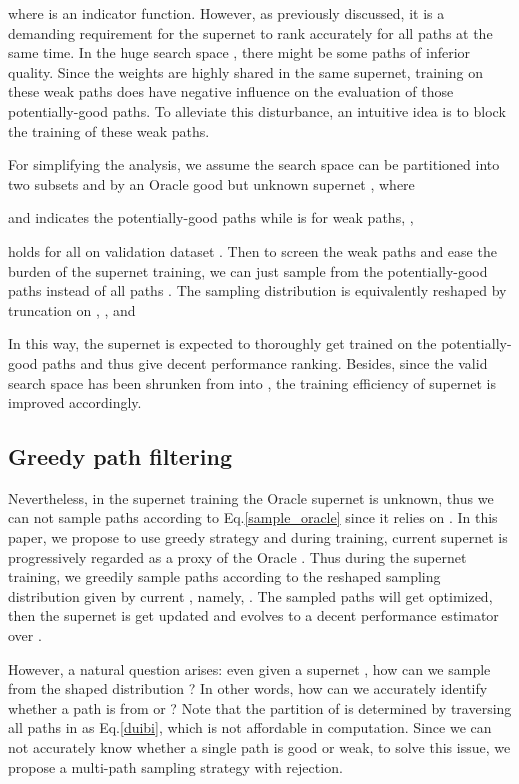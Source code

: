 \documentclass[10pt,twocolumn,letterpaper]{article}
\begin{document}
where  is an indicator function. However, as previously discussed, it is a demanding requirement for the supernet to rank accurately for all paths at the same time. In the huge search space , there might be some paths of inferior quality. Since the weights are highly shared in the same supernet, training on these weak paths does have negative influence on the evaluation of those potentially-good paths. To alleviate this disturbance, an intuitive idea is to block the training of these weak paths. 

For simplifying the analysis, we assume the search space  can be partitioned into two subsets  and  by an Oracle good but unknown supernet , where
\vspace{-1mm}

and  indicates the potentially-good paths while  is for weak paths, \ie,

holds for all  on validation dataset . Then to screen the weak paths and ease the burden of the supernet training, we can just sample from the potentially-good paths  instead of all paths . The sampling distribution  is equivalently reshaped by truncation on , \ie,  and 
\vspace{-1mm}

In this way, the supernet is expected to thoroughly get trained on the potentially-good paths and thus give decent performance ranking. Besides, since the valid search space has been shrunken from  into , the training efficiency of supernet is improved accordingly. 


\subsection{Greedy path filtering}
Nevertheless, in the supernet training the Oracle supernet  is unknown, thus we can not sample paths according to Eq.\eqref{sample_oracle} since it relies on . In this paper, we propose to use greedy strategy and during training, current supernet  is progressively regarded as a proxy of the Oracle .
Thus during the supernet training, we greedily sample paths according to the reshaped sampling distribution given by current , namely, . The sampled paths will get optimized, then the supernet is get updated and evolves to a decent performance estimator over . 

However, a natural question arises: even given a supernet , how can we sample from the shaped distribution ? In other words, how can we accurately identify whether a path is from  or ? Note that the partition of  is determined by traversing all paths in  as Eq.\eqref{duibi}, which is not affordable in computation. Since we can not accurately know whether a single path is good or weak, to solve this issue, we propose a multi-path sampling strategy with rejection. 
\end{document}
